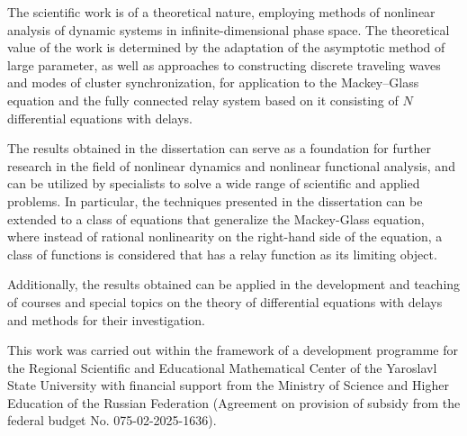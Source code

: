 \bigskip

{\influence} The scientific work is of a theoretical nature, employing methods of nonlinear analysis of dynamic systems in infinite-dimensional phase space. The theoretical value of the work is determined by the adaptation of the asymptotic method of large parameter, as well as approaches to constructing discrete traveling waves and modes of cluster synchronization, for application to the Mackey--Glass equation and the fully connected relay system based on it consisting of $N$ differential equations with delays.

The results obtained in the dissertation can serve as a foundation for further research in the field of nonlinear dynamics and nonlinear functional analysis, and can be utilized by specialists to solve a wide range of scientific and applied problems. In particular, the techniques presented in the dissertation can be extended to a class of equations that generalize the Mackey-Glass equation, where instead of rational nonlinearity on the right-hand side of the equation, a class of functions is considered that has a relay function as its limiting object.

Additionally, the results obtained can be applied in the development and teaching of courses and special topics on the theory of differential equations with delays and methods for their investigation.

This work was carried out within the framework of a development programme for the Regional Scientific and Educational Mathematical Center of the Yaroslavl State University with financial support from the Ministry of Science and Higher Education of the Russian Federation (Agreement on provision of subsidy from the federal budget No. 075-02-2025-1636).

\bigskip

